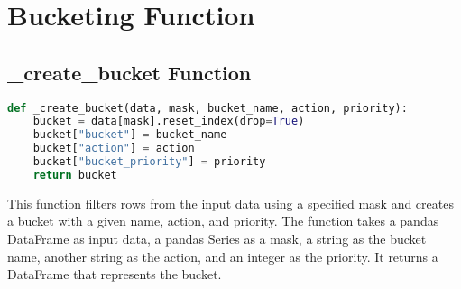 \section{Bucketing Function}
\subsection{\_create\_bucket Function}

\begin{lstlisting}[language=Python]
def _create_bucket(data, mask, bucket_name, action, priority):
    bucket = data[mask].reset_index(drop=True)
    bucket["bucket"] = bucket_name
    bucket["action"] = action
    bucket["bucket_priority"] = priority
    return bucket
\end{lstlisting}

This function filters rows from the input data using a specified mask and creates a bucket with a given name, action, and priority. The function takes a pandas DataFrame as input data, a pandas Series as a mask, a string as the bucket name, another string as the action, and an integer as the priority. It returns a DataFrame that represents the bucket.

